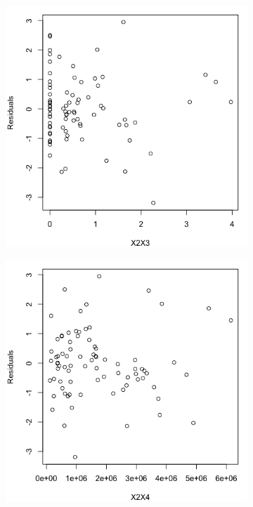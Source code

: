 \documentclass[10pt]{report}
\begin{document}
\begin{enumerate}
\begin{figure}[H]
\begin{subfigure}[b]{.25\linewidth}
		\end{subfigure}\\
		\begin{subfigure}[b]{.25\linewidth}
			\includegraphics[width=\linewidth]{p2/18e_x2x3.png}
		\end{subfigure}%
		\begin{subfigure}[b]{.25\linewidth}
			\includegraphics[width=\linewidth]{p2/18e_x2x4.png} 

\end{subfigure}
\end{figure}
\end{enumerate}
\end{document}
